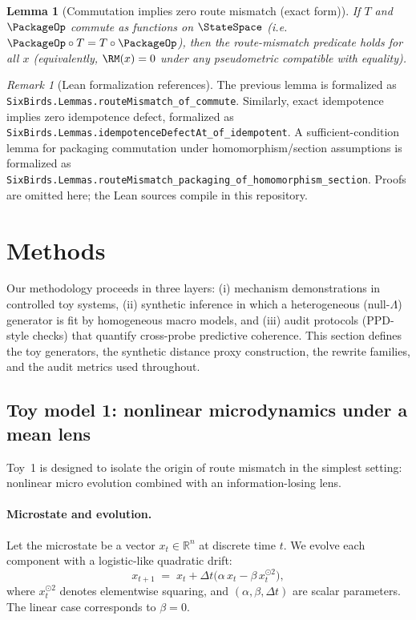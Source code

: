 \documentclass[11pt]{article}
\theoremstyle{definition}
\theoremstyle{plain}
\newtheorem{lemma}[definition]{Lemma}
\theoremstyle{remark}
\newtheorem{remark}[definition]{Remark}
\begin{document}
\begin{lemma}[Commutation implies zero route mismatch (exact form)]
If $T$ and $\PackageOp$ commute as functions on $\StateSpace$ (i.e.\ $\PackageOp\circ T = T\circ\PackageOp$), then the route-mismatch predicate holds for all $x$ (equivalently, $\RM(x)=0$ under any pseudometric compatible with equality).
\end{lemma}

\begin{remark}[Lean formalization references]
The previous lemma is formalized as \texttt{SixBirds.Lemmas.routeMismatch\_of\_commute}.
Similarly, exact idempotence implies zero idempotence defect, formalized as \texttt{SixBirds.Lemmas.idempotenceDefectAt\_of\_idempotent}.
A sufficient-condition lemma for packaging commutation under homomorphism/section assumptions is formalized as \texttt{SixBirds.Lemmas.routeMismatch\_packaging\_of\_homomorphism\_section}.
Proofs are omitted here; the Lean sources compile in this repository.
\end{remark}

\section{Methods}\label{sec:methods}
Our methodology proceeds in three layers: (i) mechanism demonstrations in controlled toy systems, (ii) synthetic inference in which a heterogeneous (null-$\Lambda$) generator is fit by homogeneous macro models, and (iii) audit protocols (PPD-style checks) that quantify cross-probe predictive coherence. This section defines the toy generators, the synthetic distance proxy construction, the rewrite families, and the audit metrics used throughout.

\subsection{Toy model 1: nonlinear microdynamics under a mean lens}\label{sec:methods:toy1}
Toy~1 is designed to isolate the origin of route mismatch in the simplest setting: nonlinear micro evolution combined with an information-losing lens.

\paragraph{Microstate and evolution.}
Let the microstate be a vector $x_t\in\mathbb{R}^n$ at discrete time $t$.
We evolve each component with a logistic-like quadratic drift:
\begin{equation}
x_{t+1} \;=\; x_t + \Delta t\big(\alpha\,x_t - \beta\,x_t^{\odot 2}\big),
\label{eq:toy1_dynamics}
\end{equation}
where $x_t^{\odot 2}$ denotes elementwise squaring, and $(\alpha,\beta,\Delta t)$ are scalar parameters.
The linear case corresponds to $\beta=0$.
\end{document}
